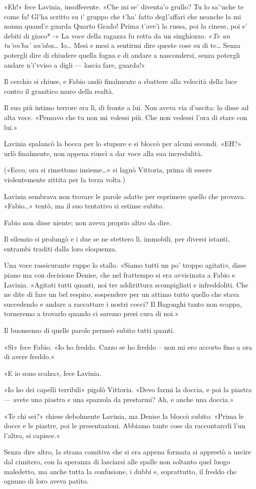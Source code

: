 «Eh!» fece Lavinia, insofferente. «Che mi se' diventa'o grullo? Tu lo sa'`nche te come fa! Gl'ha scritto su i' gruppo che t'ha' fatto degl'affari che neanche la mi nonna quand'e guarda Quarto Grado! Prima t'ave'i la russa, poi la cinese, poi e' debiti di gioco* -» La voce della ragazza fu rotta da un singhiozzo. «\emph{Te un tu'nn'ha' un'idea\ldots{}} Io\ldots{} Mesi e mesi a sentirmi dire queste cose su di te\ldots{} Senza potergli dire di chiudere quella fogna e di andare a nascondersi, senza potergli andare n'i'vviso a digli --- lascia fare, guarda!»

Il cerchio si chiuse, e Fabio andò finalmente a sbattere alla velocità della luce contro il granitico muro della realtà.

Il suo più intimo terrore era lì, di fronte a lui. Non aveva via d'uscita: lo disse ad alta voce. «Pensavo che tu non mi volessi più. Che non vedessi l'ora di stare con lui.»

Lavinia spalancò la bocca per lo stupore e si bloccò per alcuni secondi. «EH?» urlò finalmente, non appena riuscì a dar voce alla sua incredulità.

(«Ecco, ora si rimettono insieme\ldots{}» si lagnò Vittoria, prima di essere violentemente zittita per la terza volta.)

Lavinia sembrava non trovare le parole adatte per esprimere quello che provava. «Fabio\ldots{}» tentò, ma il suo tentativo si estinse subito.

Fabio non disse niente; non aveva proprio altro da dire.

Il silenzio si prolungò e i due se ne stettero lì, immobili, per diversi istanti, entrambi traditi dalla loro eloquenza.

Una voce rassicurante ruppe lo stallo. «Siamo tutti un po' troppo agitati», disse piano ma con decisione Denise, che nel frattempo si era avvicinata a Fabio e Lavinia. «Agitati tutti quanti, noi tre addirittura scompigliati e infreddoliti. Che ne dite di fare un bel respiro, sospendere per un attimo tutto quello che stava succedendo e andare a raccattare i nostri cocci? Il Bagonghi tanto non scappa, torneremo a trovarlo quando ci saremo presi cura di noi.»

Il buonsenso di quelle parole permeò subito tutti quanti.

«Sì» fece Fabio. «Io ho freddo. Cazzo se ho freddo -- non mi ero accorto fino a ora di avere freddo.»

«E io sono scalza», fece Lavinia.

«Io ho dei capelli terribili» pigolò Vittoria. «Devo farmi la doccia, e poi la piastra --- avete una piastra e una spazzola da prestarmi? Ah, e anche una doccia.»

«Te chi sei?» chiese debolmente Lavinia, ma Denise la bloccò subito: «Prima le docce e le piastre, poi le presentazioni. Abbiamo tante cose da raccontarcdi l'un l'altro, si capisce.»

Senza dire altro, la strana comitiva che si era appena formata si apprestò a uscire dal cimitero, con la speranza di lasciarsi alle spalle non soltanto quel luogo maledetto, ma anche tutta la confusione, i dubbi e, soprattutto, il freddo che ognuno di loro aveva patito.
